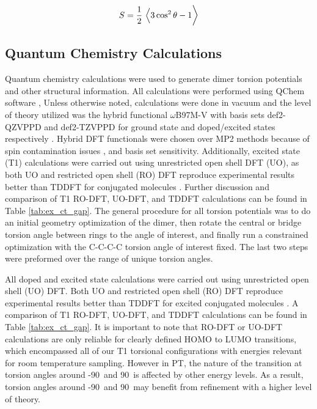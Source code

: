 \begin{equation}
\label{eq:S}
S = \frac{1}{2} \ \Big \langle \large 3\cos^2\theta - 1 \Big \rangle
\end{equation}

\subsection{Quantum Chemistry Calculations}
Quantum chemistry calculations were used to generate dimer torsion potentials and other structural information. All calculations were performed using QChem software \cite{Shao2015}, Unless otherwise noted, calculations were done in vacuum and the level of theory utilized was the hybrid functional $\omega$B97M-V with basis sets def2-QZVPPD and def2-TZVPPD for ground state and doped/excited states respectively \cite{Mardirossian2016, Weigend2005}. Hybrid DFT functionals were chosen over MP2 methods because of spin contamination issues \cite{Salzner2014}, and basis set sensitivity. Additionally, excited state (T1) calculations were carried out using unrestricted open shell DFT (UO), as both UO and restricted open shell (RO) DFT reproduce experimental results better than TDDFT for conjugated molecules \cite{Hait2016}. Further discussion and comparison of T1 RO-DFT, UO-DFT, and TDDFT calculations can be found in Table \ref{tab:ex_ct_gap}. The general procedure for all torsion potentials was to do an initial geometry optimization of the dimer, then rotate the central or bridge torsion angle between rings to the angle of interest, and finally run a constrained optimization with the C-C-C-C torsion angle of interest fixed. The last two steps were preformed over the range of unique torsion angles.

All doped and excited state calculations were carried out using unrestricted open shell (UO) DFT. Both UO and restricted open shell (RO) DFT reproduce experimental results better than TDDFT for excited conjugated molecules \cite{Hait2016}. A comparison of T1 RO-DFT, UO-DFT, and TDDFT calculations can be found in Table \ref{tab:ex_ct_gap}. It is important to note that RO-DFT or UO-DFT calculations are only reliable for clearly defined HOMO to LUMO transitions, which encompassed all of our T1 torsional configurations with energies relevant for room temperature sampling. However in PT, the nature of the transition at torsion angles around -90\textdegree \ and 90\textdegree \ is affected by other energy levels. As a result, torsion angles around -90\textdegree \ and 90\textdegree \ may benefit from refinement with a higher level of theory.
